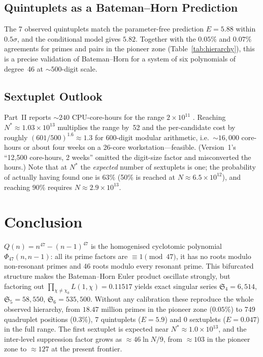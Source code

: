 ﻿\documentclass[11pt,a4paper]{article}
\newcommand{\Sk}[1]{\mathfrak{S}_{#1}}
\begin{document}
\subsection{Quintuplets as a Bateman--Horn Prediction}

The 7 observed quintuplets match the parameter-free prediction $E = 5.88$
within $0.5\sigma$, and the conditional model gives $5.82$.  Together with the
$0.05\%$ and $0.07\%$ agreements for primes and pairs in the pioneer zone
(Table~\ref{tab:hierarchy}), this is a precise validation of Bateman--Horn for a
system of six polynomials of degree~46 at ${\sim}500$-digit scale.

\subsection{Sextuplet Outlook}

Part~II reports ${\sim}240$ CPU-core-hours for the range $2 \times 10^{11}$
\cite{Chen2026b}.  Reaching $N^* \approx 1.03 \times 10^{13}$ multiplies the
range by~52 and the per-candidate cost by roughly $(601/500)^{1.6} \approx 1.3$
for 600-digit modular arithmetic, i.e.\ ${\sim}16{,}000$ core-hours or about
four weeks on a 26-core workstation---feasible.  (Version~1's ``12{,}500
core-hours, 2 weeks'' omitted the digit-size factor and misconverted the hours.)
Note that at $N^*$ the \emph{expected} number of sextuplets is one; the
probability of actually having found one is $63\%$ (50\% is reached at
$N \approx 6.5 \times 10^{12}$), and reaching $90\%$ requires
$N \approx 2.9 \times 10^{13}$.

\section{Conclusion}

$Q(n) = n^{47} - (n{-}1)^{47}$ is the homogenised cyclotomic polynomial
$\Phi_{47}(n, n{-}1)$: all its prime factors are $\equiv 1 \pmod{47}$, it has no
roots modulo non-resonant primes and 46 roots modulo every resonant prime.
This bifurcated structure makes the Bateman--Horn Euler product oscillate
strongly, but factoring out $\prod_{\chi \ne \chi_0} L(1,\chi) = 0.11517$ yields
exact singular series $\Sk{4} = 6{,}514$, $\Sk{5} = 58{,}550$,
$\Sk{6} = 535{,}500$.  Without any calibration these reproduce the whole
observed hierarchy, from $18.47$ million primes in the pioneer zone ($0.05\%$)
to 749 quadruplet positions ($0.3\%$), 7 quintuplets ($E = 5.9$) and 0
sextuplets ($E = 0.047$) in the full range.  The first sextuplet is expected
near $N^* \approx 1.0 \times 10^{13}$, and the inter-level suppression factor
grows as $\approx 46 \ln N / 9$, from ${\approx}103$ in the pioneer zone to
${\approx}127$ at the present frontier.
\end{document}
